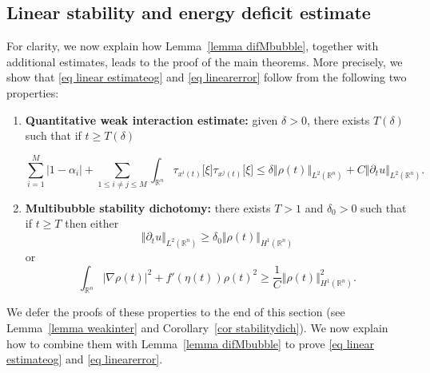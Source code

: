 \documentclass[11pt,letterpaper,reqno]{amsart}
\newcommand{\R}{\mathbb{R}}
\theoremstyle{plain}%
\theoremstyle{definition}
\numberwithin{equation}{section}
\numberwithin{figure}{section}
\begin{document}
\subsection{Linear stability and energy deficit estimate}\label{subsec linear stability} 
For clarity, we now explain how Lemma~\ref{lemma difMbubble}, together with additional estimates, leads to the proof of the main theorems. More precisely, we show that \eqref{eq linear estimateog} and \eqref{eq linearerror} follow from the following two properties:
\begin{enumerate}
    	\item \textbf{Quantitative weak interaction estimate:} given $\delta>0$, there exists $T(\delta)$ such that if $t\geq T(\delta)$
	
	 \begin{equation}\label{eq quant weak interaction}  
		\sum_{i=1}^M|1-\alpha_i|+\sum_{1\leq i \neq j \leq M}\int_{\R^n}\tau_{x^i(t)}\big[\xi\big]\tau_{x^j(t)}\big[\xi\big]\leq \delta \Vert \rho(t)\Vert_{L^2(\R^n)} + C\Vert \partial_t u\Vert_{L^2(\R^n)}.
	\end{equation}

    \item  \textbf{Multibubble stability dichotomy:} there exists $T>1$ and $\delta_0>0$ such that if $t\geq T$ then either 
    \begin{equation}\label{eq condstab}
        \Vert \partial_t u\Vert_{L^2(\R^n)} \geq \delta_0 \Vert \rho(t)\Vert_{H^1(\R^n)}
    \end{equation} 
    or
	\begin{equation}\label{eq stability Mbubble0}
		\int_{\R^n}   |\nabla \rho(t)|^2 + f'(\eta(t)) \rho(t)^2 \geq \frac{1}{C}\Vert \rho(t)\Vert_{H^1(\R^n)}^2.
	\end{equation}
	
\end{enumerate}
We defer the proofs of these properties to the end of this section (see Lemma~\ref{lemma weakinter} and Corollary~\ref{cor stabilitydich}). We now explain how to combine them with Lemma~\ref{lemma difMbubble} to prove \eqref{eq linear estimateog} and \eqref{eq linearerror}.
\end{document}
